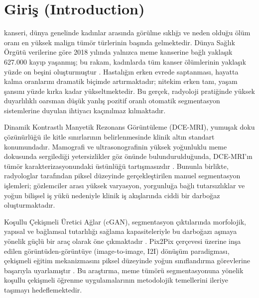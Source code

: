\documentclass[10pt,journal,compsoc]{IEEEtran}
\begin{document}
\maketitle
\IEEEdisplaynontitleabstractindextext
\IEEEpeerreviewmaketitle

\section{Giriş \textnormal{\small{(Introduction)}}}

 kanseri, dünya genelinde kadınlar arasında görülme sıklığı ve neden olduğu ölüm oranı en yüksek malign tümör türlerinin başında gelmektedir. Dünya Sağlık Örgütü verilerine göre 2018 yılında yalnızca meme kanserine bağlı yaklaşık 627.000 kayıp yaşanmış; bu rakam, kadınlarda tüm kanser ölümlerinin yaklaşık yüzde on beşini oluşturmuştur \cite{haq2022bts}. Hastalığın erken evrede saptanması, hayatta kalma oranlarını dramatik biçimde artırmaktadır; nitekim erken tanı, yaşam şansını yüzde kırka kadar yükseltmektedir. Bu gerçek, radyoloji pratiğinde yüksek duyarlılıklı oarsman düşük yanlış pozitif oranlı otomatik segmentasyon sistemlerine duyulan ihtiyacı kaçınılmaz kılmaktadır.

Dinamik Kontrastlı Manyetik Rezonans Görüntüleme (DCE-MRI), yumuşak doku çözünürlüğü ile kitle sınırlarının belirlenmesinde klinik altın standart konumundadır. Mamografi ve ultrasonografinin yüksek yoğunluklu meme dokusunda sergilediği yetersizlikler göz önünde bulundurulduğunda, DCE-MRI'ın tümör karakterizasyonundaki üstünlüğü tartışmasızdır \cite{haq2022bts}. Bununla birlikte, radyologlar tarafından piksel düzeyinde gerçekleştirilen manuel segmentasyon işlemleri; gözlemciler arası yüksek varyasyon, yorgunluğa bağlı tutarsızlıklar ve yoğun bilişsel iş yükü nedeniyle klinik iş akışlarında ciddi bir darboğaz oluşturmaktadır.

Koşullu Çekişmeli Üretici Ağlar (cGAN), segmentasyon çıktılarında morfolojik, yapısal ve bağlamsal tutarlılığı sağlama kapasiteleriyle bu darboğazı aşmaya yönelik güçlü bir araç olarak öne çıkmaktadır \cite{goodfellow2014generative}. Pix2Pix çerçevesi üzerine inşa edilen görüntüden-görüntüye (image-to-image, I2I) dönüşüm paradigması, çekişmeli eğitim mekanizmasını piksel düzeyinde yoğun sınıflandırma görevlerine başarıyla uyarlamıştır \cite{haq2022bts}. Bu araştırma, meme tümörü segmentasyonuna yönelik koşullu çekişmeli öğrenme uygulamalarının metodolojik temellerini ileriye taşımayı hedeflemektedir.
\end{document}
